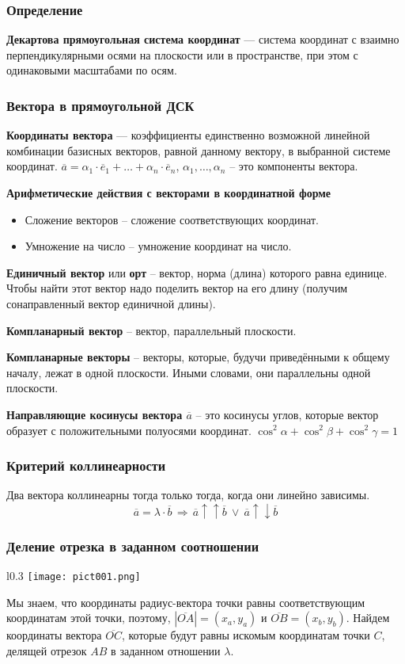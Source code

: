\documentclass{article}
\begin{document}
\subsubsection{Определение}
\textbf{Декартова прямоугольная система координат} — система координат с взаимно
перпендикулярными осями на плоскости или в пространстве, при этом с одинаковыми
масштабами по осям.

\subsubsection{Вектора в прямоугольной ДСК}

\textbf{Координаты вектора} — коэффициенты единственно возможной линейной комбинации
базисных векторов, равной данному вектору, в выбранной системе координат.
$\overline{a} = \alpha_1\cdot\overline{e}_1 +\ldots+ \alpha_n\cdot\overline{e}_n$, $\alpha_1,\ldots,\alpha_n$ -- это компоненты вектора.

\textbf{Арифметические действия с векторами в координатной форме}
\begin{itemize}
    \item Сложение векторов -- сложение соответствующих координат.
    \item Умножение на число -- умножение координат на число.
\end{itemize}
\textbf{Единичный вектор} или \textbf{орт} -- вектор, норма (длина) которого равна единице.
Чтобы найти этот вектор надо поделить вектор на его длину (получим сонаправленный
вектор единичной длины).

\textbf{Компланарный вектор} -- вектор, параллельный плоскости.

\textbf{Компланарные векторы} -- векторы, которые, будучи приведёнными к общему началу,
лежат в одной плоскости. Иными словами, они параллельны одной плоскости.

\textbf{Направляющие косинусы вектора $\overline{a}$} – это косинусы углов,
которые вектор образует с положительными полуосями
координат. $\cos^2\alpha + \cos^2\beta + \cos^2\gamma = 1$
\subsubsection{Критерий коллинеарности}
Два вектора коллинеарны тогда только тогда, когда они линейно зависимы. $$\overline{a}=\lambda\cdot\overline{b}\,\Rightarrow\,\overline{a}\uparrow\uparrow\overline{b}\: \vee \:\overline{a}\uparrow\downarrow\overline{b}$$

\newpage
\subsubsection{Деление отрезка в заданном соотношении}
\begin{wrapfigure}{l}{0.3\textwidth}
\centering
\texttt{[image: pict001.png]}
\end{wrapfigure}
Мы знаем, что координаты радиус-вектора точки равны
соответствующим координатам этой точки, поэтому, $|\overline{OA}|=(x_a,y_a)$ и $\overline{OB}=(x_b,y_b)$. Найдем координаты вектора $\overline{OC}$,
которые будут равны искомым координатам точки $C$,
делящей отрезок $AB$ в заданном отношении $\lambda$.
\end{document}

